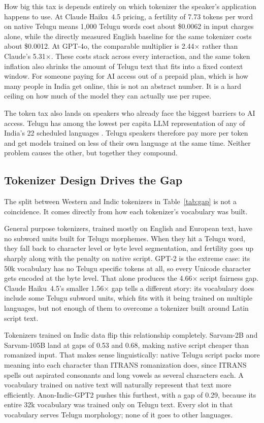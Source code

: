 ﻿\documentclass[11pt]{article}
\begin{document}
How big this tax is depends entirely on which tokenizer the
speaker's application happens to use. At Claude Haiku~4.5 pricing, a
fertility of 7.73 tokens per word on native Telugu means 1,000 Telugu
words cost about \$0.0062 in input charges alone, while the directly
measured English baseline for the same tokenizer costs about \$0.0012.
At GPT-4o, the comparable multiplier is 2.44$\times$ rather than
Claude's 5.31$\times$. These costs stack across every interaction,
and the same token inflation also shrinks the amount of Telugu text
that fits into a fixed context window. For someone paying for AI
access out of a prepaid plan, which is how many people in India get
online, this is not an abstract number. It is a hard ceiling on how
much of the model they can actually use per rupee.

The token tax also lands on speakers who already face the biggest
barriers to AI access. Telugu has among the lowest per capita LLM
representation of any of India's 22 scheduled languages
\citep{doddapaneni-etal-2023-towards}. Telugu speakers therefore pay
more per token and get models trained on less of their own language
at the same time. Neither problem causes the other, but together
they compound.

\subsection{Tokenizer Design Drives the Gap}

The split between Western and Indic tokenizers in
Table~\ref{tab:gap} is not a coincidence. It comes directly from how
each tokenizer's vocabulary was built.

General purpose tokenizers, trained mostly on English and European
text, have no subword units built for Telugu morphemes. When they
hit a Telugu word, they fall back to character level or byte level
segmentation, and fertility goes up sharply along with the penalty
on native script. GPT-2 is the extreme case: its 50k vocabulary has
no Telugu specific tokens at all, so every Unicode character gets
encoded at the byte level. That alone produces the 4.66$\times$
script fairness gap. Claude Haiku~4.5's smaller 1.56$\times$ gap
tells a different story: its vocabulary does include some Telugu
subword units, which fits with it being trained on multiple
languages, but not enough of them to overcome a tokenizer built
around Latin script text.

Tokenizers trained on Indic data flip this relationship completely.
Sarvam-2B and Sarvam-105B land at gaps of 0.53 and 0.68, making
native script cheaper than romanized input. That makes sense
linguistically: native Telugu script packs more meaning into each
character than ITRANS romanization does, since ITRANS spells out
aspirated consonants and long vowels as several characters each. A
vocabulary trained on native text will naturally represent that text
more efficiently. Anon-Indic-GPT2 pushes this furthest, with a
gap of 0.29, because its entire 32k vocabulary was trained only on
Telugu text. Every slot in that vocabulary serves Telugu morphology;
none of it goes to other languages.
\end{document}
